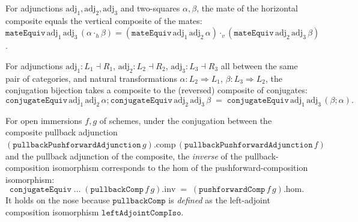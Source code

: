 \begin{lemma}
  \label{mk-lem:mateequiv_vcomp}
  \mathlibok

  For adjunctions \(\mathrm{adj}_1, \mathrm{adj}_2, \mathrm{adj}_3\) and two-squares \(\alpha,
  \beta\), the mate of the horizontal composite equals the vertical composite of the mates:
  \(\mathtt{mateEquiv}\,\mathrm{adj}_1\,\mathrm{adj}_3\,(\alpha \cdot_h \beta)
    = (\mathtt{mateEquiv}\,\mathrm{adj}_1\,\mathrm{adj}_2\,\alpha)
      \cdot_v (\mathtt{mateEquiv}\,\mathrm{adj}_2\,\mathrm{adj}_3\,\beta)\).
\end{lemma}

\begin{lemma}
  \label{mk-lem:conjugateequiv_comp}
  \mathlibok

  For adjunctions \(\mathrm{adj}_1 : L_1 \dashv R_1\), \(\mathrm{adj}_2 : L_2 \dashv R_2\),
  \(\mathrm{adj}_3 : L_3 \dashv R_3\) all between the same pair of categories, and natural
  transformations \(\alpha : L_2 \Rightarrow L_1\), \(\beta : L_3 \Rightarrow L_2\), the conjugation
  bijection takes a composite to the (reversed) composite of conjugates:
  \[
    \mathtt{conjugateEquiv}\,\mathrm{adj}_1\,\mathrm{adj}_2\,\alpha
      \mathbin{;} \mathtt{conjugateEquiv}\,\mathrm{adj}_2\,\mathrm{adj}_3\,\beta
      \;=\; \mathtt{conjugateEquiv}\,\mathrm{adj}_1\,\mathrm{adj}_3\,(\beta \mathbin{;} \alpha).
  \]
\end{lemma}

\begin{lemma}
  \label{mk-lem:conjugate_equiv_pullbackcomp_inv}
  \mathlibok

  For open immersions \(f, g\) of schemes, under the conjugation between the composite pullback
  adjunction \((\mathtt{pullbackPushforwardAdjunction}\,g).\mathrm{comp}\,
  (\mathtt{pullbackPushforwardAdjunction}\,f)\) and the pullback adjunction of the composite, the
  \emph{inverse} of the pullback-composition isomorphism corresponds to the hom of the
  pushforward-composition isomorphism:
  \[
    \mathtt{conjugateEquiv}\;\dots\;(\mathtt{pullbackComp}\,f\,g).\mathrm{inv}
      \;=\; (\mathtt{pushforwardComp}\,f\,g).\mathrm{hom}.
  \]
  It holds on the nose because \(\mathtt{pullbackComp}\) is \emph{defined} as the left-adjoint
  composition isomorphism \(\mathtt{leftAdjointCompIso}\).
\end{lemma}

